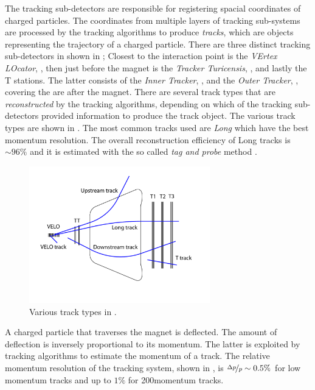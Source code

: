 The tracking sub-detectors are responsible for registering spacial coordinates of charged particles.
The coordinates from multiple layers of tracking sub-systems are processed by the tracking algorithms
to produce {\it tracks}, which are objects representing the trajectory of a charged particle. There are
three distinct tracking sub-detectors in \lhcb shown in ; Closest to the interaction point is
the {\it VErtex LOcator}, \velo, then just before the \lhcb magnet is the {\it Tracker Turicensis}, \ttracker,
and  lastly the T stations. The latter consists of the {\it Inner Tracker}, \intr, and the {\it Outer Tracker}, \ot,
covering the are after the \lhcb magnet. There are several track types that are {\it reconstructed} by
the tracking algorithms, depending on which of the tracking sub-detectors provided information to produce
the track object. The various track types are shown in . The most common tracks used
are {\it Long} which have the best momentum resolution. The overall reconstruction efficiency of Long
tracks is $\sim 96\%$ and it is estimated with the so called {\it tag and probe} method \cite{Aaij:1748269}.

\begin{figure}[t]
  \centering
  \includegraphics[width=0.7\textwidth]{Figures/Chapter2/trackTypesRunIAndII}
  \caption{Various track types in \lhcb.}
  \label{track_types}
\end{figure}

A charged particle that traverses the \lhcb magnet is deflected. The amount of deflection is inversely proportional
to its momentum. The latter is exploited by tracking algorithms to estimate the momentum of a track. The relative
momentum resolution of the tracking system, shown in , is $\nicefrac{\Delta p}{p} \sim 0.5 \%$
for low momentum tracks and up to $1\%$ for 200\gevc momentum tracks.

